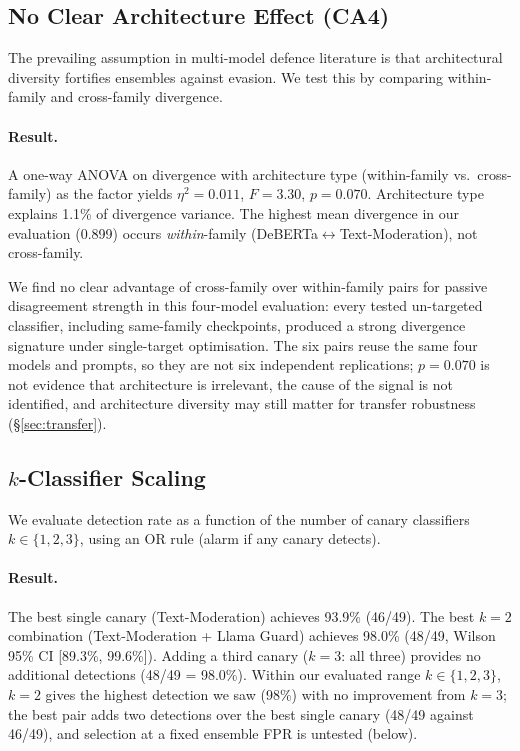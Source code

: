 \documentclass{article}
\begin{document}
\subsection{No Clear Architecture Effect (CA4)}
\label{sec:ca4}

The prevailing assumption in multi-model defence literature is that architectural diversity fortifies ensembles against evasion. We test this by comparing within-family and cross-family divergence.

\paragraph{Result.} A one-way ANOVA on divergence with architecture type (within-family vs.\ cross-family) as the factor yields $\eta^2 = 0.011$, $F = 3.30$, $p = 0.070$. Architecture type explains 1.1\% of divergence variance. The highest mean divergence in our evaluation (0.899) occurs \emph{within}-family (DeBERTa$\leftrightarrow$Text-Moderation), not cross-family.

We find no clear advantage of cross-family over within-family pairs for passive disagreement strength in this four-model evaluation: every tested un-targeted classifier, including same-family checkpoints, produced a strong divergence signature under single-target optimisation. The six pairs reuse the same four models and prompts, so they are not six independent replications; $p=0.070$ is not evidence that architecture is irrelevant, the cause of the signal is not identified, and architecture diversity may still matter for transfer robustness (\S\ref{sec:transfer}).

\subsection{$k$-Classifier Scaling}
\label{sec:k-scaling}

We evaluate detection rate as a function of the number of canary classifiers $k \in \{1, 2, 3\}$, using an OR rule (alarm if any canary detects).

\paragraph{Result.} The best single canary (Text-Moderation) achieves 93.9\% (46/49). The best $k{=}2$ combination (Text-Moderation + Llama Guard) achieves 98.0\% (48/49, Wilson 95\% CI [89.3\%, 99.6\%]). Adding a third canary ($k{=}3$: all three) provides no additional detections (48/49 = 98.0\%). Within our evaluated range $k \in \{1, 2, 3\}$, $k{=}2$ gives the highest detection we saw (98\%) with no improvement from $k{=}3$; the best pair adds two detections over the best single canary (48/49 against 46/49), and selection at a fixed ensemble FPR is untested (below).
\end{document}
